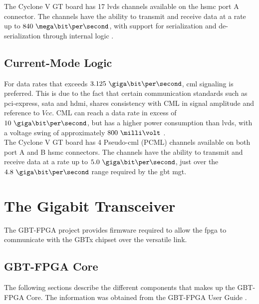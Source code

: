 \documentclass[main.tex]{subfiles}
\begin{document}
The Cyclone V GT board has 17 \gls{lvds} channels available on the \gls{hsmc} port A connector. The channels have the ability to transmit and receive data at a rate up to $840\ \mega\bit\per\second$, with support for serialization and de-serialization through internal logic \cite{altera_cvoverview15}.

\section{Current-Mode Logic}

For data rates that exceeds $3.125\ \giga\bit\per\second$, \gls{cml} signaling is preferred. This is due to the fact that certain communication standards such as \acrshort{pci}-express, \acrshort{sata} and \acrshort{hdmi}, shares consistency with CML in signal amplitude and reference to $Vcc$. CML can reach a data rate in excess of $10\ \giga\bit\per\second$, but has a higher power consumption than \gls{lvds}, with a voltage swing of approximately $800\ \milli\volt$ \cite{ti08lvds}.\\

The Cyclone V GT board has 4 Pseudo-\gls{cml} (PCML) channels available on both port A and B \gls{hsmc} connectors. The channels have the ability to transmit and receive data at a rate up to $5.0\ \giga\bit\per\second$, just over the $4.8\ \giga\bit\per\second$ range required by the \gls{gbt} \gls{mgt}. \cite{altera_cyclonekit}






\chapter{The Gigabit Transceiver} \label{chap:gbt}


The GBT-FPGA project provides firmware required to allow the \gls{fpga} to communicate with the GBTx chipset over the versatile link.

\section{GBT-FPGA Core}
The following sections describe the different components that makes up the GBT-FPGA Core. The information was obtained from the GBT-FPGA User Guide \cite{gbt_fpga}.
\end{document}
